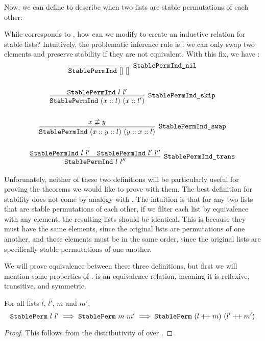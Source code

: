 \documentclass[11pt]{thesis}
\begin{document}
Now, we can define  to describe when two lists are
stable permutations of each other:


While  corresponds to , how can
we modify  to create an inductive relation for stable
lists? Intuitively, the problematic inference rule is
: we can only swap two elements and preserve
stability if they are not equivalent. With this fix, we have :
\begin{gather*}
  \infer[\var{StablePermInd\_nil}]{\var{StablePermInd}~[]~[]}{}
  \\ \\
  \infer[\var{StablePermInd\_skip}]{\var{StablePermInd}~(x :: l)~(x :: l')}{%
    \var{StablePermInd}~l~l'
  }
  \\ \\
  \infer[\var{StablePermInd\_swap}]
        {\var{StablePermInd}~(x :: y :: l)~(y :: x :: l)}
        {x \not\equiv y}
  \\ \\
  \infer[\var{StablePermInd\_trans}]{\var{StablePermInd}~l~l''}{
    \var{StablePermInd}~l~l' & \var{StablePermInd}~l'~l''
  }
\end{gather*}

Unforunately, neither of these two definitions will be particularly
useful for proving the theorems we would like to prove with them. The
best definition for stability does not come by analogy with
. The intuition is that for any two lists that are
stable permutations of each other, if we filter each list by
equivalence with any element, the resulting lists should be identical.
This is because they must have the same elements, since the original
lists are permutations of one another, and those elements must be in
the same order, since the original lists are specifically stable
permutations of one another.


We will prove equivalence between these three definitions, but first
we will mention some properties of .  is an
equivalence relation, meaning it is reflexive, transitive, and symmetric.

\begin{lemma}
  For all lists $l$, $l'$, $m$ and $m'$,
  \begin{equation*}
    \texttt{StablePerm}~l~l' \implies \texttt{StablePerm}~m~m' \implies
    \texttt{StablePerm}~(l \mathbin{+\mkern-3mu+} m)~(l' \mathbin{+\mkern-3mu+} m')
  \end{equation*}
\end{lemma}
\begin{proof}
  This follows from the distributivity of  over .
\end{proof}
\end{document}
